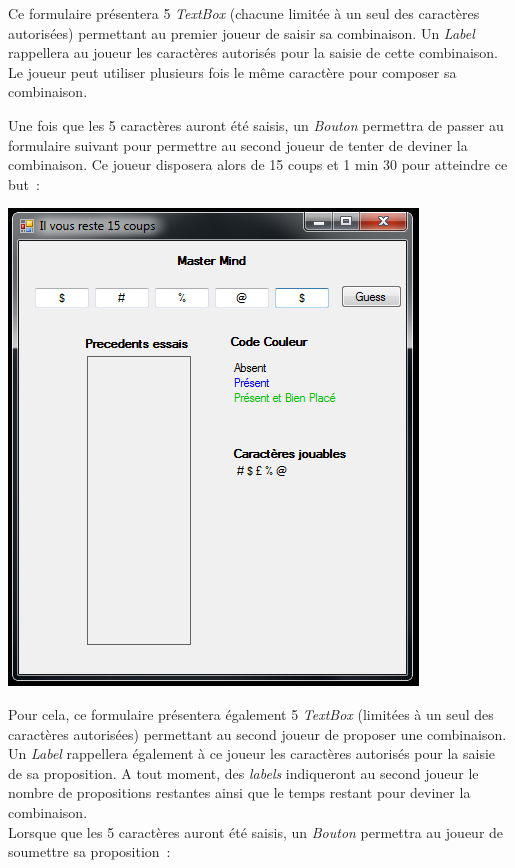 \documentclass[10pt,a4paper,oneside]{article}
\begin{document}
Ce formulaire présentera 5 {\em TextBox} (chacune limitée à un seul des caractères autorisées) permettant au premier joueur de saisir sa combinaison. Un {\em Label} rappellera au joueur les caractères autorisés pour la saisie de cette combinaison. Le joueur peut utiliser plusieurs fois le même caractère pour composer sa combinaison.

\medskip

Une fois que les 5 caractères auront été saisis, un {\em Bouton} permettra de passer au formulaire suivant pour permettre au second joueur de tenter de deviner la combinaison. Ce joueur disposera alors de 15 coups et 1 min 30 pour atteindre ce but~:

\begin{center}
    \includegraphics[scale=0.6]{pictures/player2try1.png}
\end{center}

Pour cela, ce formulaire présentera également 5 {\em TextBox} (limitées à un seul des caractères autorisées) permettant au second joueur de proposer une combinaison. Un {\em Label} rappellera également à ce joueur les caractères autorisés pour la saisie de sa proposition. A tout moment, des {\em labels} indiqueront au second joueur le nombre de propositions restantes ainsi que le temps restant pour deviner la combinaison.\\

Lorsque que les 5 caractères auront été saisis, un {\em Bouton} permettra au joueur de soumettre sa proposition~:
\end{document}
